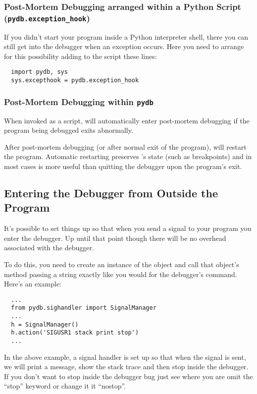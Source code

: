 \subsubsection{Post-Mortem Debugging arranged within a Python Script
  ({\tt pydb.exception_hook})}

If you didn't start your program inside a Python interpreter shell,
there you can still get into the debugger when an exception
occurs. Here you need to arrange for this possibility adding to the
script these lines:

\begin{verbatim}
  import pydb, sys
  sys.excepthook = pydb.exception_hook
\end{verbatim}

\subsubsection{Post-Mortem Debugging within {\tt pydb}}
When invoked as a script,  will automatically enter
post-mortem debugging if the program being debugged exits
abnormally. 

After post-mortem debugging (or after normal exit of the
program),  will restart the program.  Automatic restarting
preserves 's state (such as breakpoints) and in most cases
is more useful than quitting the debugger upon the program's exit.

\subsection{Entering the Debugger from Outside the Program}
It's possible to set things up so that when you send a signal to your
program you enter the debugger. Up until that point though there will
be no overhead associated with the debugger.

To do this, you need to create an instance of the
 object and call that object's 
method passing a string exactly like you would for the 
debugger's  command. Here's an example:

\begin{verbatim}
  ...
  from pydb.sighandler import SignalManager
  ...
  h = SignalManager()
  h.action('SIGUSR1 stack print stop')
  ...

\end{verbatim}

In the above example, a signal handler is set up so that when the
 signal is sent, we will print a message, show the stack
trace and then stop inside the debugger. If you don't want to stop
inside the debugger bug just see where you are omit the ``stop''
keyword or change it it ``nostop''.

